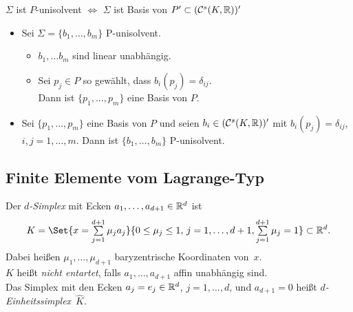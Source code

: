 \documentclass{cheat-sheet}
\newcommand{\Cont}{\mathcal{C}} %
\begin{document}
\begin{bem}
  $\Sigma$ ist $P$-unisolvent $\iff$ $\Sigma$ ist Basis von $P' \subset (\Cont^s(K, \R))'$
\end{bem}

\begin{samepage}

\begin{lem}
  \begin{itemize}
    \item Sei $\Sigma = \{ b_1, \ldots, b_m \}$ P-unisolvent.
    \begin{itemize}
      \item $b_1, \ldots b_m$ sind linear unabhängig.
      \item Sei $p_j \in P$ so gewählt, dass $b_i(p_j) = \delta_{ij}$. \\
      Dann ist $\{ p_1, \ldots, p_m \}$ eine Basis von $P$.
    \end{itemize}
    \item Sei $\{ p_1, \ldots, p_m \}$ eine Basis von $P$ und seien $b_i \in (\Cont^s(K, \R))'$ mit $b_i(p_j) = \delta_{ij}$, $i, j = 1, \ldots, m$.
    Dann ist $\{ b_1, \ldots, b_m \}$ P-unisolvent.
  \end{itemize}
\end{lem}

\subsection{Finite Elemente vom Lagrange-Typ}

\end{samepage}

\begin{defn}
  Der \emph{$d$-Simplex} mit Ecken $a_1, \ldots, a_{d+1} \in \mathbb{R}^d$ ist
  \[
    K = \Set{x = \sum_{j=1}^{d+1} \mu_j a_j}{0 \leq \mu_j \leq 1, \, j = 1, \ldots, d + 1, \sum_{j=1}^{d+1} \mu_j = 1} \subset \R^d.
  \]
  Dabei heißen $\mu_1, \ldots, \mu_{d+1}$ baryzentrische Koordinaten von~$x$. \\
  $K$ heißt \emph{nicht entartet}, falls $a_1, \ldots, a_{d+1}$ affin unabhängig sind. \\
  Das Simplex mit den Ecken $a_j = e_j \in \mathbb{R}^d$, $j = 1, \ldots, d$, und $a_{d+1} = 0$ heißt \emph{$d$-Einheitssimplex}~$\hat{K}$.
\end{defn}


\end{document}

